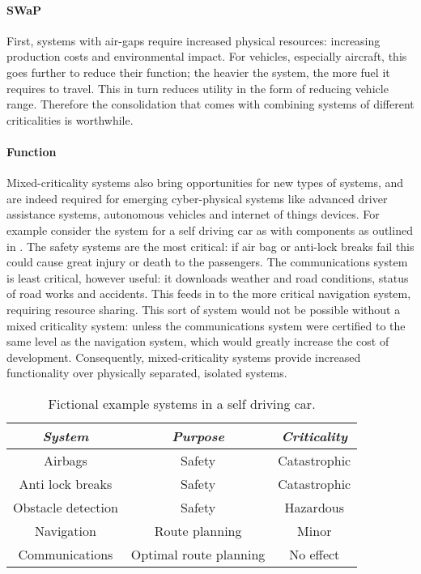 \paragraph{SWaP} First, systems with air-gaps require increased physical
resources: increasing production costs and environmental impact.
For vehicles, especially aircraft, this goes further to reduce their function; the
heavier the system,  the more fuel it requires to travel. This in turn reduces
utility in the form of reducing vehicle range. Therefore the consolidation that comes
with combining systems of different criticalities is worthwhile.  

\paragraph{Function} 
Mixed-criticality systems also bring opportunities for new types of
systems, and are indeed required for emerging cyber-physical systems like
advanced driver assistance systems, autonomous vehicles and internet of things devices.
For example consider the system for a self driving
car as with components as outlined in .  The safety
systems are the most critical: if air bag or anti-lock breaks fail this could
cause great injury or death to the passengers.  The communications system is
least critical, however useful: it downloads weather and road conditions,
status of road works and accidents.  This feeds in to the more critical
navigation system, requiring resource sharing.  This sort of system would not
be possible without a mixed criticality system: unless the communications
system were certified to the same level as the navigation system, which would
greatly increase the cost of development.  Consequently, mixed-criticality
systems provide increased functionality over physically separated, isolated
systems.

\begin{table} 
\centering
\begin{tabular}{ccc}\toprule
    \emph{System}     & \emph{Purpose} & \emph{Criticality} \\\midrule
     Airbags            & Safety &  Catastrophic \\
     Anti lock breaks   & Safety &  Catastrophic \\
     Obstacle detection & Safety &  Hazardous    \\
     Navigation         & Route planning & Minor \\  
     Communications     & Optimal route planning & No effect \\
    \bottomrule
\end{tabular}
\caption{Fictional example systems in a self driving car.}
\label{tab:self-driving-car}
\end{table}

